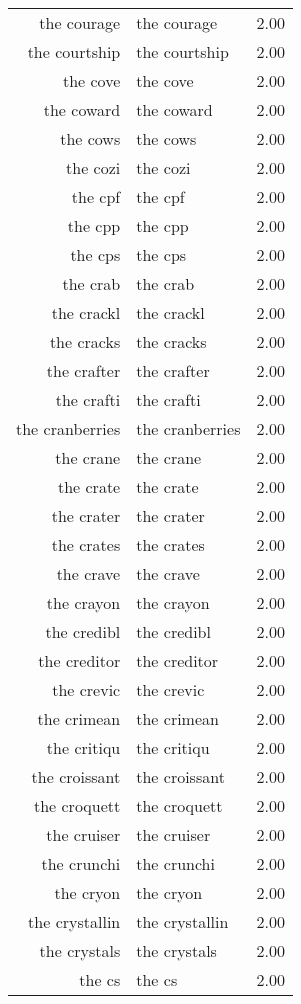 \begin{table}[ht]
\begin{tabular}{rlr}
  the courage & the courage & 2.00 \\ 
  the courtship & the courtship & 2.00 \\ 
  the cove & the cove & 2.00 \\ 
  the coward & the coward & 2.00 \\ 
  the cows & the cows & 2.00 \\ 
  the cozi & the cozi & 2.00 \\ 
  the cpf & the cpf & 2.00 \\ 
  the cpp & the cpp & 2.00 \\ 
  the cps & the cps & 2.00 \\ 
  the crab & the crab & 2.00 \\ 
  the crackl & the crackl & 2.00 \\ 
  the cracks & the cracks & 2.00 \\ 
  the crafter & the crafter & 2.00 \\ 
  the crafti & the crafti & 2.00 \\ 
  the cranberries & the cranberries & 2.00 \\ 
  the crane & the crane & 2.00 \\ 
  the crate & the crate & 2.00 \\ 
  the crater & the crater & 2.00 \\ 
  the crates & the crates & 2.00 \\ 
  the crave & the crave & 2.00 \\ 
  the crayon & the crayon & 2.00 \\ 
  the credibl & the credibl & 2.00 \\ 
  the creditor & the creditor & 2.00 \\ 
  the crevic & the crevic & 2.00 \\ 
  the crimean & the crimean & 2.00 \\ 
  the critiqu & the critiqu & 2.00 \\ 
  the croissant & the croissant & 2.00 \\ 
  the croquett & the croquett & 2.00 \\ 
  the cruiser & the cruiser & 2.00 \\ 
  the crunchi & the crunchi & 2.00 \\ 
  the cryon & the cryon & 2.00 \\ 
  the crystallin & the crystallin & 2.00 \\ 
  the crystals & the crystals & 2.00 \\ 
  the cs & the cs & 2.00 \\ 

\end{tabular}
\end{table}
